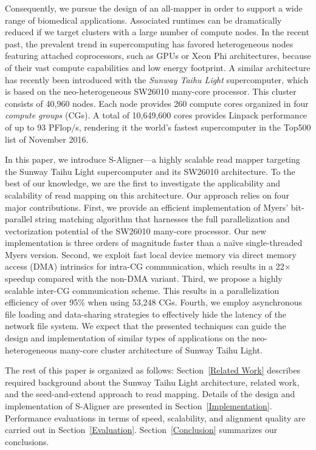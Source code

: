 Consequently, we pursue the design of an all-mapper in order to
support a wide range of biomedical applications. Associated runtimes
can be dramatically reduced if we target clusters with a large number
of compute nodes. In the recent past, the prevalent trend in
supercomputing has favored heterogeneous nodes featuring attached
coprocessors, such as GPUs or Xeon Phi architectures, because of their
vast compute capabilities and low energy footprint. A similar
architecture has recently been introduced with the \emph{Sunway Taihu
  Light} supercomputer, which is based on the neo-heterogeneous
SW26010 many-core processor. This cluster consists of 40,960
nodes. Each node provides 260 compute cores organized in four {\em
  compute groups} (CGs). A total of 10,649,600 cores provides Linpack
performance of up to 93 PFlop/s, rendering it the world's fastest
supercomputer in the Top500 list of November 2016.

In this paper, we introduce S-Aligner---a highly scalable read mapper
targeting the Sunway Taihu Light supercomputer and its SW26010
architecture. To the best of our knowledge, we are the first to
investigate the applicability and scalability of read mapping on this
architecture. Our approach relies on four major contributions. First,
we provide an efficient implementation of Myers' bit-parallel string
matching algorithm that harnesses the full parallelization and
vectorization potential of the SW26010 many-core processor. Our new
implementation is three orders of magnitude faster than a na\"ive
single-threaded Myers version. Second, we exploit fast local device
memory via direct memory access (DMA) intrinsics for intra-CG communication, which results in
a 22$\times$ speedup compared with the non-DMA variant. Third, we propose a
highly scalable inter-CG communication scheme. This
results in a parallelization efficiency of over 95\% when using 53,248
CGs. Fourth, we employ asynchronous file loading and data-sharing
strategies to effectively hide the latency of the network file
system. We expect that the presented techniques can guide the
design and implementation of similar types of applications on the
neo-heterogeneous many-core cluster architecture of Sunway Taihu
Light.

The rest of this paper is organized as follows: Section~\ref{Related
  Work} describes required background about the Sunway Taihu Light
architecture, related work, and the seed-and-extend approach to read
mapping. Details of the design and implementation of S-Aligner are
presented in Section~\ref{Implementation}. Performance evaluations in
terms of speed, scalability, and alignment quality are carried out in
Section~\ref{Evaluation}. Section~\ref{Conclusion} summarizes our
conclusions.
